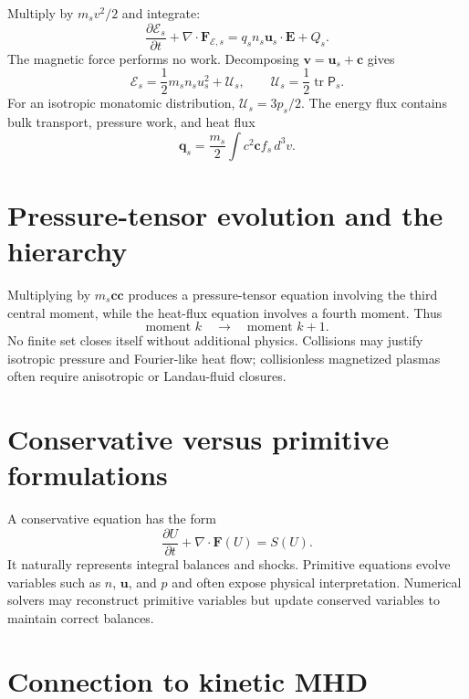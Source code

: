 \documentclass[11pt]{article}
\begin{document}
Multiply by $m_sv^2/2$ and integrate:
\begin{equation}
\frac{\partial \mathcal E_s}{\partial t}
+\nabla\cdot\mathbf F_{\mathcal E,s}
=q_sn_s\mathbf u_s\cdot\mathbf E+Q_s.
\end{equation}
The magnetic force performs no work. Decomposing $\mathbf v=\mathbf u_s+\mathbf c$ gives
\begin{equation}
\mathcal E_s=\frac{1}{2}m_sn_su_s^2+\mathcal U_s,\qquad
\mathcal U_s=\frac{1}{2}\operatorname{tr}\mathsf P_s.
\end{equation}
For an isotropic monatomic distribution, $\mathcal U_s=3p_s/2$. The energy flux contains bulk transport, pressure work, and heat flux
\begin{equation}
\mathbf q_s=\frac{m_s}{2}\int c^2\mathbf c f_s\,d^3v.
\end{equation}


\section{Pressure-tensor evolution and the hierarchy}

Multiplying by $m_s\mathbf c\mathbf c$ produces a pressure-tensor equation involving the third central moment, while the heat-flux equation involves a fourth moment. Thus
\begin{equation}
\text{moment }k\quad\longrightarrow\quad\text{moment }k+1.
\end{equation}
No finite set closes itself without additional physics. Collisions may justify isotropic pressure and Fourier-like heat flow; collisionless magnetized plasmas often require anisotropic or Landau-fluid closures.


\section{Conservative versus primitive formulations}

A conservative equation has the form
\begin{equation}
\frac{\partial U}{\partial t}+\nabla\cdot\mathbf F(U)=S(U).
\end{equation}
It naturally represents integral balances and shocks. Primitive equations evolve variables such as $n$, $\mathbf u$, and $p$ and often expose physical interpretation. Numerical solvers may reconstruct primitive variables but update conserved variables to maintain correct balances.


\section{Connection to kinetic MHD}
\end{document}
